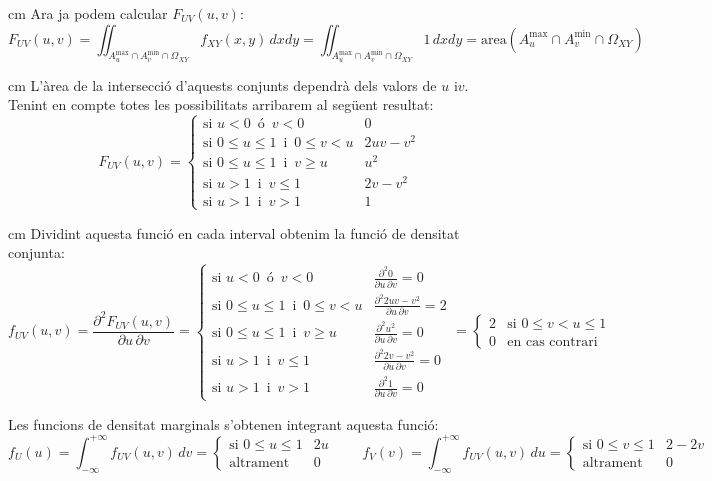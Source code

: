 \documentclass{article}
\begin{document}
 cm
\noindent
Ara ja podem calcular $F_{UV}(u, v)$:
\[
F_{UV}(u, v)=\iint_{A_{u}^{\max} \cap A_{v}^{\min} \cap \Omega_{XY}} f_{XY}(x, y) \, dxdy= 
\iint_{A_{u}^{\max} \cap A_{v}^{\min} \cap \Omega_{XY}} 1 \, dxdy=\mathrm{area}(A_{u}^{\max} \cap A_{v}^{\min} \cap \Omega_{XY})
\]

 cm
\noindent
L'\`area de la intersecci\'o d'aquests conjunts dependr\`a dels valors de $u$ i$v$. Tenint en compte 
totes les possibilitats arribarem al seg\"uent resultat:
\[
F_{UV}(u, v)=\begin{cases}
\text{si } u < 0 \, \text{ \'o } \, v < 0 & 0 \\
\text{si } 0 \leq u \leq 1  \, \text{ i } \, 0 \leq v < u & 2uv-v^2 \\
\text{si } 0 \leq u \leq 1  \, \text{ i } \, v \geq u & u^2 \\
\text{si } u > 1 \, \text{ i } \,   v \leq 1  & 2v-v^2 \\
\text{si } u > 1 \, \text{ i } \, v > 1 & 1 
\end{cases}
\]
 
 cm
\noindent
Dividint aquesta funci\'o en cada interval obtenim la funci\'o de densitat conjunta:
\[
f_{UV}(u, v)=\frac{\partial^2 F_{UV}(u, v)}{\partial u \, \partial v}=\begin{cases}
\text{si } u < 0 \, \text{ \'o } \, v < 0 & \frac{\partial^2 0}{\partial u \, \partial v}=0 \\
\text{si } 0 \leq u \leq 1  \, \text{ i } \, 0 \leq v < u & \frac{\partial^2 2uv-v^2}{\partial u \, \partial v}=2  \\
\text{si } 0 \leq u \leq 1  \, \text{ i } \, v \geq u & \frac{\partial^2 u^2}{\partial u \, \partial v} =0 \\
\text{si } u > 1 \, \text{ i } \,   v \leq 1  & \frac{\partial^2 2v-v^2}{\partial u \, \partial v}=0 \\
\text{si } u > 1 \, \text{ i } \, v > 1 &  \frac{\partial^2 1}{\partial u \, \partial v} = 0
\end{cases}
= \begin{cases} 2 & \text{si } 0 \leq v < u \leq 1 \\ 0 & \text{en cas contrari} \end{cases}
\]

Les funcions de densitat marginals s'obtenen integrant aquesta funci\'o:
\[
f_U(u)=\int_{-\infty}^{+\infty} f_{UV}(u, v) \,dv = \begin{cases} \text{si } 0 \leq u \leq 1 & 2u \\ \text{altrament} & 0 \end{cases}
\qquad 
f_V(v)=\int_{-\infty}^{+\infty} f_{UV}(u, v) \,du = \begin{cases} \text{si } 0 \leq v \leq 1 & 2-2v \\ \text{altrament} & 0 \end{cases}
\]
\end{document}
